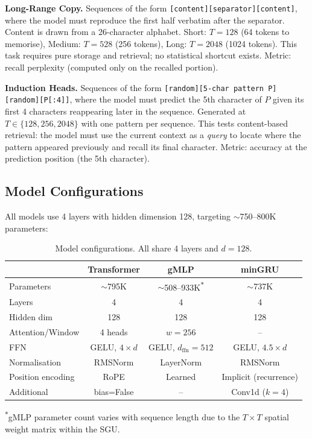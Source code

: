 \documentclass[10pt,a4paper]{article}
\begin{document}
\textbf{Long-Range Copy.} Sequences of the form \texttt{[content][separator][content]}, where the model must reproduce the first half verbatim after the separator. Content is drawn from a 26-character alphabet. Short: $T{=}128$ (64 tokens to memorise), Medium: $T{=}528$ (256 tokens), Long: $T{=}2048$ (1024 tokens). This task requires pure storage and retrieval; no statistical shortcut exists. Metric: recall perplexity (computed only on the recalled portion).

\textbf{Induction Heads.} Sequences of the form \texttt{[random][5-char pattern P][random][P[:4]]}, where the model must predict the 5th character of $P$ given its first 4 characters reappearing later in the sequence. Generated at $T \in \{128, 256, 2048\}$ with one pattern per sequence. This tests content-based retrieval: the model must use the current context as a \emph{query} to locate where the pattern appeared previously and recall its final character. Metric: accuracy at the prediction position (the 5th character).

\subsection{Model Configurations}

\label{sec:model_config}
All models use 4 layers with hidden dimension 128, targeting ${\sim}$750--800K parameters:

\begin{table}[h]
\centering
\caption{Model configurations. All share 4 layers and $d{=}128$.}
\small
\begin{tabular}{lccc}
\toprule
 & \textbf{Transformer} & \textbf{gMLP} & \textbf{minGRU} \\
\midrule
Parameters & ${\sim}$795K & ${\sim}$508--933K\textsuperscript{$*$} & ${\sim}$737K \\
Layers & 4 & 4 & 4 \\
Hidden dim & 128 & 128 & 128 \\
Attention/Window & 4 heads & $w{=}256$ & -- \\
FFN & GELU, $4 \times d$ & GELU, $d_\text{ffn}{=}512$ & GELU, $4.5 \times d$ \\
Normalisation & RMSNorm & LayerNorm & RMSNorm \\
Position encoding & RoPE & Learned & Implicit (recurrence) \\
Additional & bias=False & -- & Conv1d ($k{=}4$) \\
\bottomrule
\end{tabular}

{\footnotesize \textsuperscript{$*$}gMLP parameter count varies with sequence length due to the $T \times T$ spatial weight matrix within the SGU.}
\end{table}
\end{document}
